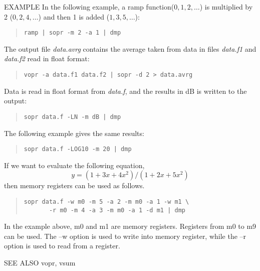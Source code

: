 \begin{qsection}{EXAMPLE}
In the following example, a ramp function($0,1,2,\ldots$)
is multiplied by 2 ($0,2,4,\ldots$)
and then 1 is added ($1,3,5,\ldots$):
\begin{quote}
  \verb!ramp | sopr -m 2 -a 1 | dmp!
\end{quote}
\par
The output file {\em data.avrg} contains the average taken from
data in files {\em data.f1} and {\em data.f2} read in float format:
\begin{quote}
  \verb!vopr -a data.f1 data.f2 | sopr -d 2 > data.avrg!
\end{quote}
\par
Data is read in float format from {\em data.f},
and the results in dB is written to the output:
\begin{quote}
  \verb!sopr data.f -LN -m dB | dmp!
\end{quote}
The following example gives the same results:
\begin{quote}
  \verb!sopr data.f -LOG10 -m 20 | dmp!
\end{quote}
\par
If we want to evaluate the following equation,
\[
y = (1 + 3x + 4x^2) / (1 + 2x + 5x^2) 
\]
then memory registers can be used as follows.
\begin{quote}
\verb!sopr data.f -w m0 -m 5 -a 2 -m m0 -a 1 -w m1 \!\\
\verb!       -r m0 -m 4 -a 3 -m m0 -a 1 -d m1 | dmp!
\end{quote}
In the example above, m0 and m1 are memory registers.
Registers from m0 to m9 can be used.
The --w option is used to write into memory register,
while the --r option is used to read from a register.
\end{qsection}

\begin{qsection}{SEE ALSO}
  vopr, vsum
\end{qsection}
